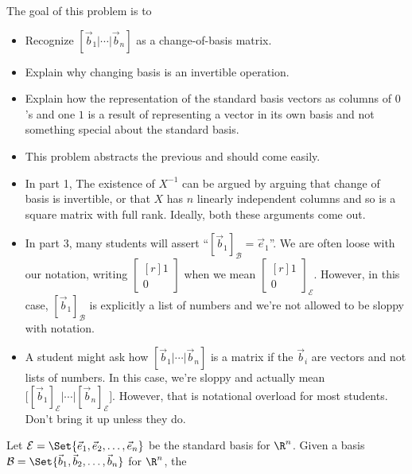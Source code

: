 \documentclass{problemset}
\newcommand{\mat}[1]{\begin{bmatrix*}[r]#1\end{bmatrix*}}
\begin{document}
	\begin{annotation}
		\begin{goals}

			The goal of this problem is to
			\begin{itemize}
				\item Recognize $[\vec b_1|\cdots|\vec b_n]$ as a change-of-basis matrix.
				\item Explain why changing basis is an invertible operation.
				\item Explain how the representation of the standard basis vectors as columns
					of $0$'s and one $1$ is a result of representing a vector in its own
					basis and not something special about the standard basis.
			\end{itemize}
		\end{goals}

		\begin{notes}
			\begin{itemize}
				\item This problem abstracts the previous and should come easily.
				\item In part 1, The existence of $X^{-1}$ can be argued by arguing that change of basis
					is invertible, or that $X$ has $n$ linearly independent columns and
					so is a square matrix with full rank. Ideally, both these arguments come out.
				\item In part 3, many students will assert ``$[\vec b_1]_{\mathcal B}=\vec e_1$''.
					We are often loose with our notation, writing $\mat{1\\0}$
					when we mean $\mat{1\\0}_{\mathcal E}$. However, in this case,
					$[\vec b_1]_{\mathcal B}$ is explicitly a list of numbers and we're
					not allowed to be sloppy with notation.
				\item A student might ask how $[\vec b_1|\cdots|\vec b_n]$ is a matrix if the $\vec b_i$
					are vectors and not lists of numbers. In this case, we're sloppy and actually
					mean $\Big[[\vec b_1]_{\mathcal E}|\cdots|[\vec b_n]_{\mathcal E}\Big]$. However, that is
					notational overload for most students. Don't bring it up unless they do.
			\end{itemize}
		\end{notes}
	\end{annotation}
	Let $\mathcal E=\Set{\vec e_1,\vec e_2,\ldots,\vec e_n}$ be the standard basis for $\R^n$.
	Given a basis $\mathcal B=\Set{\vec b_1,\vec b_2,\ldots,\vec b_n}$ for $\R^n$, the
\end{document}
